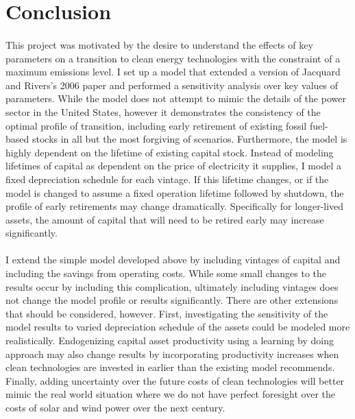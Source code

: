 \documentclass{article}
\begin{document}
\section{Conclusion}

\paragraph{} This project was motivated by the desire to understand the effects of key parameters on a transition to clean energy technologies with the constraint of a maximum emissions level. I set up a model that extended a version of Jacquard and Rivers's 2006 paper and performed a sensitivity analysis over key values of parameters. While the model does not attempt to mimic the details of the power sector in the United States, however it demonstrates the consistency of the optimal profile of transition, including early retirement of existing fossil fuel-based stocks in all but the most forgiving of scenarios. Furthermore, the model is highly dependent on the lifetime of existing capital stock. Instead of modeling lifetimes of capital as dependent on the price of electricity it supplies, I model a fixed depreciation schedule for each vintage. If this lifetime changes, or if the model is changed to assume a fixed operation lifetime followed by shutdown, the profile of early retirements may change dramatically. Specifically for longer-lived assets, the amount of capital that will need to be retired early may increase significantly. 

\paragraph{} I extend the simple model developed above by including vintages of capital and including the savings from operating costs. While some small changes to the results occur by including this complication, ultimately including vintages does not change the model profile or results significantly. There are other extensions that should be considered, however. First, investigating the sensitivity of the model results to varied depreciation schedule of the assets could be modeled more realistically. Endogenizing capital asset productivity using a learning by doing approach may also change results by incorporating productivity increases when clean technologies are invested in earlier than the existing model recommends. Finally, adding uncertainty over the future costs of clean technologies will better mimic the real world situation where we do not have perfect foresight over the costs of solar and wind power over the next century. 
\end{document}
